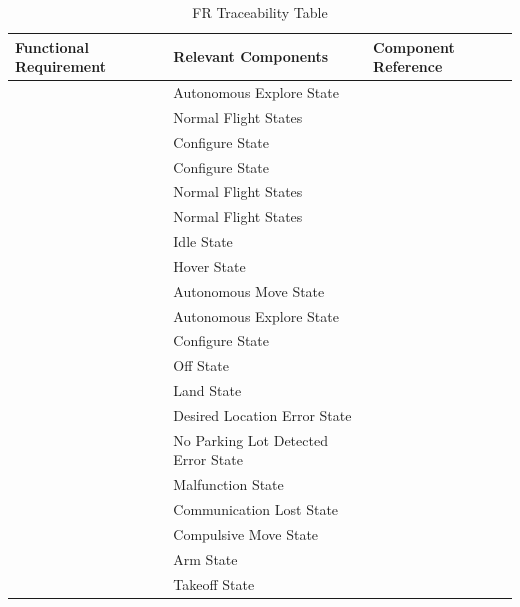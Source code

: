 \documentclass[12pt, titlepage]{article}
\begin{document}
\begin{table}[!h]
\begin{center}
\caption {FR Traceability Table}
\label{tab:FR_DesignTrace}
\begin{tabular}{ | m{2.5cm} | m{7.5cm} | m{7.5cm} | } 
\hline
Functional Requirement & Relevant Components & Component Reference \\
\hline
\nameref{GEN_001} & Autonomous Explore State & \nameref{FlightStates} \\ \hline
\nameref{GEN_002} & Normal Flight States & \nameref{FlightStates} \\ \hline
\nameref{GEN_003} & Configure State & \nameref{NonFlightStates} \\ \hline
\nameref{GEN_004} & Configure State & \nameref{NonFlightStates} \\ \hline
\nameref{GEN_005} & Normal Flight States & \nameref{FlightStates} \\ \hline
\nameref{GEN_006} & Normal Flight States & \nameref{FlightStates} \\ \hline
\nameref{STA_000} & Idle State & \nameref{NonFlightStates} \\ \hline
\nameref{STA_001} & Hover State & \nameref{FlightStates} \\ \hline
\nameref{STA_002} & Autonomous Move State & \nameref{FlightStates} \\ \hline
\nameref{STA_003} & Autonomous Explore State & \nameref{FlightStates} \\ \hline
\nameref{STA_004} & Configure State & \nameref{NonFlightStates} \\ \hline
\nameref{STA_005} & Off State & \nameref{NonFlightStates} \\ \hline
\nameref{STA_006} & Land State & \nameref{FlightStates} \\ \hline
\nameref{STA_007} & Desired Location Error State & \nameref{ErrorStates} \\ \hline
\nameref{STA_008} & No Parking Lot Detected Error State & \nameref{ErrorStates} \\ \hline
\nameref{STA_009} & Malfunction State & \nameref{ErrorStates} \\ \hline
\nameref{STA_010} & Communication Lost State & \nameref{ErrorStates} \\ \hline
\nameref{STA_011} & Compulsive Move State & \nameref{FlightStates} \\ \hline
\nameref{STA_012} & Arm State & \nameref{FlightStates} \\ \hline
\nameref{STA_013} & Takeoff State & \nameref{FlightStates} \\ \hline

\end{tabular}
\end{center}
\end{table}
\end{document}

